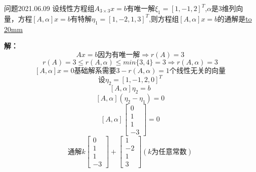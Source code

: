 \begin{mybox}{问题2021.06.09}
	\qquad 设线性方程组$A_{3\times 3}x=b$有唯一解$\xi_{1}=\left[1,-1,2\right]^T$,$\alpha$是3维列向量，方程$\left[ A,\alpha\right]x=b$有特解$\eta_{1}=\left[1,-2,1,3\right]^T$,则方程组$\left[A,\alpha\right] x=b$的通解是\underline{\hbox to 20mm{}}
\end{mybox}	
\noindent
\textbf{解：}
$$Ax=b\text{因为有唯一解} \Rightarrow r(A)=3 $$
$$r(A)=3 \le r(A,\alpha)\le min\{3,4\}=3\Rightarrow r(A,\alpha)=3$$
$$\left[ A,\alpha\right]x=0 \text{基础解系需要}3-r(A,\alpha)=1\text{个线性无关的向量}$$
$$\text{设}\eta_{2}=\left[1,-1,2,0\right]^T$$
$$\left[A,\alpha\right] \eta_{2}=b$$
$$\left[A,\alpha\right] (\eta_{2}-\eta_{1})=0$$
$$\left[A,\alpha\right] \begin{bmatrix}
0 \\ 
1 \\ 
1 \\ 
-3
\end{bmatrix}=0$$
$$\text{通解} k\begin{bmatrix}
0 \\ 
1 \\ 
1 \\ 
-3
\end{bmatrix}+\begin{bmatrix}
1 \\ 
-2 \\ 
1 \\ 
3
\end{bmatrix} (k\text{为任意常数})$$